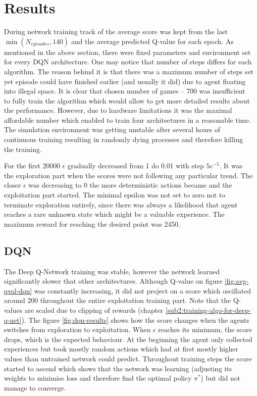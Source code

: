 \chapter{Results}
\label{cha:results}

During network training track of the average score was kept from the last $\min(N_{episodes}, 140)$ and the average predicted Q-value
for each epoch. As mentioned in the above section, there were fixed parameters and environment set for every DQN architecture. One may
notice that number of steps differs for each algorithm. The reason behind it is that there was a maximum number of steps set yet
episode could have finished earlier (and usually it did)  due to agent floating into illegal space. It is clear that chosen number of
games -- 700 was insufficient to fully train the algorithm which would allow to get more detailed results about the performance.
However, due to hardware limitations it was the maximal affordable number which enabled to train four architectures in a reasonable
time. The simulation environment was getting unstable after several hours of continuous training resulting in randomly dying processes
and therefore killing the training.

For the first 20000 $\epsilon$ gradually decreased from 1 do 0.01 with step $5e^{-5}$. It was the exploration part when the scores were
not following any particular trend. The closer $\epsilon$ was decreasing to 0 the more deterministic actions became and the
exploitation part started. The minimal epsilon was not set to zero not to terminate exploration entirely, since there was always a
likelihood that agent reaches a rare unknown state which might be a valuable experience. The maximum reward for reaching the desired
point was 2450.

\section{DQN}
\label{sec:results-dqn}

The Deep Q-Network training was stable, however the network learned significantly slower that other architectures. Although Q-value on
figure \ref{fig:avg-qval-dqn} was constantly increasing, it did not project on a score which oscillated around 200 throughout the
entire exploitation training part. Note that the Q-values are scaled due to clipping of rewards (chapter \ref{sub2:training-algo-for-deep-q-net}). The figure \ref{fig:dqn-results} shows how the score changes when the agents switches from exploration to
exploitation. When $\epsilon$ reaches its minimum, the score drops, which is the expected behaviour. At the beginning the agent only
collected experiences but took mostly random actions which had at first mostly higher values than untrained network could predict.
Throughout training steps the score started to ascend which shows that the network was learning (adjusting its weights to minimise loss
and therefore find the optimal policy $\pi^*$) but did not manage to converge.


